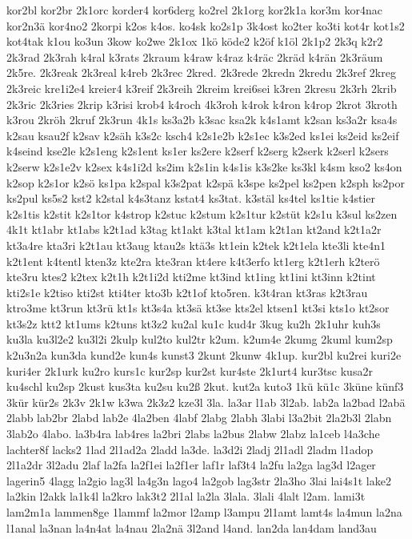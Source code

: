 {kor2bl
kor2br
2k1orc
korder4
kor6derg
ko2rel
2k1org
kor2k1a
kor3m
kor4nac
kor2n3ä
kor4no2
2korpi
k2os
k4os.
ko4sk
ko2s1p
3k4ost
ko2ter
ko3ti
kot4r
kot1s2
kot4tak
k1ou
ko3un
3kow
ko2we
2k1ox
1kö
köde2
k2öf
k1öl
2k1p2
2k3q
k2r2
2k3rad
2k3rah
k4ral
k3rats
2kraum
k4raw
k4raz
k4räc
2kräd
k4rän
2k3räum
2k5re.
2k3reak
2k3real
k4reb
2k3rec
2kred.
2k3rede
2kredn
2kredu
2k3ref
2kreg
2k3reic
kre1i2e4
kreier4
k3reif
2k3reih
2kreim
krei6sei
k3ren
2kresu
2k3rh
2krib
2k3ric
2k3ries
2krip
k3risi
krob4
k4roch
4k3roh
k4rok
k4ron
k4rop
2krot
3kroth
k3rou
2kröh
2kruf
2k3run
4k1s
ks3a2b
k3sac
ksa2k
k4s1amt
k2san
ks3a2r
ksa4s
k2sau
ksau2f
k2sav
k2säh
k3s2c
ksch4
k2s1e2b
k2s1ec
k3s2ed
ks1ei
ks2eid
ks2eif
k4seind
kse2le
k2s1eng
k2s1ent
ks1er
ks2ere
k2serf
k2serg
k2serk
k2serl
k2sers
k2serw
k2s1e2v
k2sex
k4s1i2d
ks2im
k2s1in
k4s1is
k3s2ke
ks3kl
k4sm
kso2
ks4on
k2sop
k2s1or
k2sö
ks1pa
k2spal
k3s2pat
k2spä
k3spe
ks2pel
ks2pen
k2sph
ks2por
ks2pul
ks5s2
kst2
k2stal
k4s3tanz
kstat4
ks3tat.
k3stäl
ks4tel
ks1tie
k4stier
k2s1tis
k2stit
k2s1tor
k4strop
k2stuc
k2stum
k2s1tur
k2stüt
k2s1u
k3sul
ks2zen
4k1t
kt1abr
kt1abs
k2t1ad
k3tag
kt1akt
k3tal
kt1am
k2t1an
kt2and
k2t1a2r
kt3a4re
kta3ri
k2t1au
kt3aug
ktau2s
ktä3s
kt1ein
k2tek
k2t1ela
kte3li
kte4n1
k2t1ent
k4tentl
kten3z
kte2ra
kte3ran
kt4ere
k4t3erfo
kt1erg
k2t1erh
k2terö
kte3ru
ktes2
k2tex
k2t1h
k2t1i2d
kti2me
kt3ind
kt1ing
kt1ini
kt3inn
k2tint
kti2s1e
k2tiso
kti2st
kti4ter
kto3b
k2t1of
kto5ren.
k3t4ran
kt3ras
k2t3rau
ktro3me
kt3run
kt3rü
kt1s
kt3s4a
kt3sä
kt3se
kts2el
ktsen1
kt3si
kts1o
kt2sor
kt3s2z
ktt2
kt1ums
k2tuns
kt3z2
ku2al
ku1c
kud4r
3kug
ku2h
2k1uhr
kuh3s
ku3la
ku3l2e2
ku3l2i
2kulp
kul2to
kul2tr
k2um.
k2um4e
2kumg
2kuml
kum2sp
k2u3n2a
kun3da
kund2e
kun4s
kunst3
2kunt
2kunw
4k1up.
kur2bl
ku2rei
kuri2e
kuri4er
2k1urk
ku2ro
kurs1c
kur2sp
kur2st
kur4ste
2k1urt4
kur3tsc
kusa2r
ku4schl
ku2sp
2kust
kus3ta
ku2su
ku2ß
2kut.
kut2a
kuto3
1kü
kü1c
3küne
künf3
3kür
kür2s
2k3v
2k1w
k3wa
2k3z2
kze3l
3la.
la3ar
l1ab
3l2ab.
lab2a
la2bad
l2abä
2labb
lab2br
2labd
lab2e
4la2ben
4labf
2labg
2labh
3labi
l3a2bit
2la2b3l
2labn
3lab2o
4labo.
la3b4ra
lab4res
la2bri
2labs
la2bus
2labw
2labz
la1ceb
l4a3che
lachter8f
lacks2
1lad
2l1ad2a
2ladd
la3de.
la3d2i
2ladj
2l1adl
2ladm
l1adop
2l1a2dr
3l2adu
2laf
la2fa
la2f1ei
la2f1er
laf1r
laf3t4
la2fu
la2ga
lag3d
l2ager
lagerin5
4lagg
la2gio
lag3l
la4g3n
lago4
la2gob
lag3str
2la3ho
3lai
lai4s1t
lake2
la2kin
l2akk
la1k4l
la2kro
lak3t2
2l1al
la2la
3lala.
3lali
4lalt
l2am.
lami3t
lam2m1a
lammen8ge
1lammf
la2mor
l2amp
l3ampu
2l1amt
lamt4s
la4mun
la2na
l1anal
la3nan
la4n4at
la4nau
2la2nä
3l2and
l4and.
lan2da
lan4dam
land3au
}
